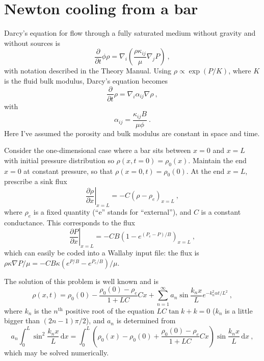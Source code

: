 \documentclass[]{scrreprt}
\begin{document}
\chapter{Newton cooling from a bar}

Darcy's equation for flow through a fully saturated medium without
gravity and without sources is 
\begin{equation}
\frac{\partial}{\partial t}\phi\rho = \nabla_{i}\left(\frac{\rho
  \kappa_{ij}}{\mu} \nabla_{j}P \right) \ ,
\end{equation}
with notation described in the Theory Manual.  Using $\rho \propto
\exp(P/K)$, where $K$ is the fluid bulk modulus, Darcy's equation
becomes
\begin{equation}
\frac{\partial}{\partial t}\rho = \nabla_{i}\alpha_{ij}\nabla\rho \ ,
\end{equation}
with 
\begin{equation}
\alpha_{ij} = \frac{\kappa_{ij}B}{\mu\phi} \ .
\end{equation}
Here I've assumed the porosity and bulk modulus are constant in space
and time.

Consider the one-dimensional case where a bar sits between $x=0$ and
$x=L$ with initial pressure distribution so $\rho(x,t=0) = \rho_{0}(x)$.
Maintain the end $x=0$ at constant pressure, so that $\rho(x=0, t) =
\rho_{0}(0)$.  At the end $x=L$, prescribe a sink flux
\begin{equation}
\left.\frac{\partial\rho}{\partial x}\right|_{x=L} = -C\left(\rho -
\rho_{e}\right)_{x=L} \ ,
\end{equation}
where $\rho_{e}$ is a fixed quantity (``e'' stands for ``external''),
and $C$ is a constant conductance.  This corresponds to the flux
\begin{equation}
\left.\frac{\partial P}{\partial x}\right|_{x=L} = -CB\left(1 -
e^{(P_{e}-P)/B}\right)_{x=L} \ ,
\end{equation}
which can easily be coded into a Wallaby input file: the flux is
$\rho\kappa\nabla P/\mu = -CB\kappa(e^{P/B} - e^{P_{e}/B})/\mu$.

The solution of this problem is well known and is
\begin{equation}
\rho(x, t) = \rho_{0}(0) - \frac{\rho_{0}(0) - \rho_{e}}{1 + LC}Cx +
\sum_{n=1}^{\infty} a_{n}\sin \frac{k_{n}x}{L}e^{-k_{n}^{2}\alpha
  t/L^{2}} \ ,
\end{equation}
where $k_{n}$ is the $n^{\mathrm{th}}$ positive root of the equation
$LC\tan k + k=0$  ($k_{n}$ is a little bigger than
$(2n-1)\pi/2$), and $a_{n}$ is determined from
\begin{equation}
a_{n}\int_{0}^{L}\sin^{2}\frac{k_{n}x}{L}\,\mathrm{d}x =
\int_{0}^{L}\left(\rho_{0}(x) - \rho_{0}(0) + \frac{\rho_{0}(0) -
  \rho_{e}}{1 + LC}Cx\right)\sin \frac{k_{n}x}{L}\,\mathrm{d}x \ ,
\end{equation}
which may be solved numerically.
\end{document}
